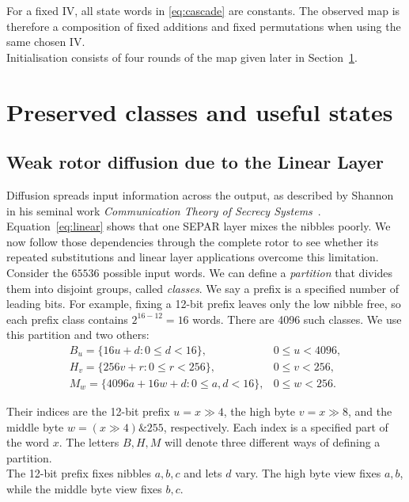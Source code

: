 \documentclass[11pt]{article}
\begin{document}
For a fixed IV, all state words in \eqref{eq:cascade} are constants.
The observed map is therefore a composition of fixed additions
and fixed permutations when using the same chosen IV.\\

Initialisation consists of four rounds of the map given later in
Section~\ref{sec:state}.


\setlength{\parskip}{5pt plus 1pt minus 1pt}
\section{Preserved classes and useful states}\label{sec:state}
\subsection{Weak rotor diffusion due to the Linear Layer}
Diffusion spreads input information across the output, as described by
Shannon in his seminal work \emph{Communication Theory of Secrecy Systems}~\cite{shannon1949}.
Equation~\eqref{eq:linear} shows
that one SEPAR layer mixes the nibbles poorly. We now follow those
dependencies through the complete rotor to see whether its repeated
substitutions and linear layer applications overcome this limitation.\\

Consider the \(65536\) possible input words. We can define a \emph{partition} that divides
them into disjoint groups, called \emph{classes}. We say a prefix is a specified number of leading bits.
For example, fixing a 12-bit prefix leaves only the low nibble free, so each prefix
class contains \(2^{16-12}=16\) words. There are 4096 such classes.
We use this partition and two others:
\[
\begin{array}{ll}
B_u=\{16u+d:0\le d<16\}, &0\le u<4096,\\
H_v=\{256v+r:0\le r<256\}, &0\le v<256,\\
M_w=\{4096a+16w+d:0\le a,d<16\}, &0\le w<256.
\end{array}
\]

Their indices are the 12-bit prefix \(u=x\gg4\), the high
byte \(v=x\gg8\), and the middle byte
\(w=(x\gg4)\mathbin{\&}255\), respectively. Each index is a
specified part of the word \(x\). The letters \(B,H,M\) will denote
three different ways of defining a partition.\\

The 12-bit prefix fixes nibbles $a,b,c$ and lets $d$ vary. The high byte view fixes $a,b$, while the middle byte view fixes $b,c$.\\
\end{document}
